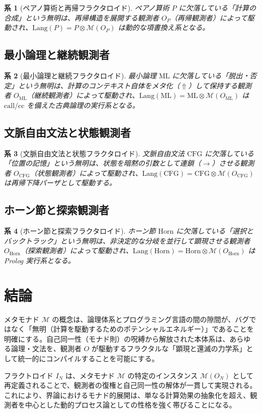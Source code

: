 \documentclass[11pt]{article}
\newcommand{\M}{\mathcal{M}}
\newcommand{\Lang}{\text{Lang}}
\newcommand{\metanegation}{\Uparrow}
\newcommand{\fractaloid}{I}
\newcommand{\ObsN}{O_N}
\newtheorem{corollary}{系}
\begin{document}
\begin{corollary}[ペアノ算術と再帰フラクタロイド]
ペアノ算術 $P$ に欠落している「計算の合成」という無明は、再帰構造を展開する観測者 $O_P$（再帰観測者）によって駆動され、$\Lang(P) = P \otimes \M(O_P)$ は動的な項書換え系となる。
\end{corollary}

\subsection{最小論理と継続観測者}

\begin{corollary}[最小論理と継続フラクタロイド]
最小論理 $\mathrm{ML}$ に欠落している「脱出・否定」という無明は、計算のコンテキスト自体をメタ化（$\metanegation$）して保持する観測者 $O_{\mathrm{ML}}$（継続観測者）によって駆動され、$\Lang(\mathrm{ML}) = \mathrm{ML} \otimes \M(O_{\mathrm{ML}})$ は $\mathrm{call/cc}$ を備えた古典論理の実行系となる。
\end{corollary}

\subsection{文脈自由文法と状態観測者}

\begin{corollary}[文脈自由文法と状態フラクタロイド]
文脈自由文法 $\mathrm{CFG}$ に欠落している「位置の記憶」という無明は、状態を暗黙の引数として連鎖（$\to$）させる観測者 $O_{\mathrm{CFG}}$（状態観測者）によって駆動され、$\Lang(\mathrm{CFG}) = \mathrm{CFG} \otimes \M(O_{\mathrm{CFG}})$ は再帰下降パーザとして駆動する。
\end{corollary}

\subsection{ホーン節と探索観測者}

\begin{corollary}[ホーン節と探索フラクタロイド]
ホーン節 $\mathrm{Horn}$ に欠落している「選択とバックトラック」という無明は、非決定的な分岐を並行して顕現させる観測者 $O_{\mathrm{Horn}}$（探索観測者）によって駆動され、$\Lang(\mathrm{Horn}) = \mathrm{Horn} \otimes \M(O_{\mathrm{Horn}})$ は Prolog 実行系となる。
\end{corollary}

\section{結論}

メタモナド $\M$ の概念は、論理体系とプログラミング言語の間の隙間が、バグではなく「無明（計算を駆動するためのポテンシャルエネルギー）」であることを明確にする。自己同一性（モナド則）の呪縛から解放された本体系は、あらゆる論理・文法を、観測者 $O$ が駆動するフラクタルな「顕現と還滅の力学系」として統一的にコンパイルすることを可能にする。

フラクトロイド $\fractaloid_N$ は、メタモナド $\M$ の特定のインスタンス $\M(\ObsN)$ として再定義されることで、観測者の復権と自己同一性の解体が一貫して実現される。これにより、界論におけるモナド的展開は、単なる計算効果の抽象化を超え、観測者を中心とした動的プロセス論としての性格を強く帯びることになる。
\end{document}
